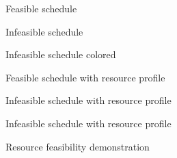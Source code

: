 \documentclass{article}
\begin{document}
\begin{figure}[ht]
	\centering
	
	\caption{Feasible schedule}
	\label{fig:activity_graph}
\end{figure}

\begin{figure}[ht]
	\centering
	
	\caption{Infeasible schedule}
	\label{fig:activity_graph}
\end{figure}

\begin{figure}[ht]
	\centering
	
	\caption{Infeasible schedule colored}
	\label{fig:activity_graph}
\end{figure}

\begin{figure}[ht]
	\centering
	
	\caption{Feasible schedule with resource profile}
	\label{fig:activity_graph}
\end{figure}

\begin{figure}[ht]
	\centering
	
	\caption{Infeasible schedule with resource profile}
	\label{fig:activity_graph}
\end{figure}

\begin{figure}[ht]
	\centering
	
	\caption{Infeasible schedule with resource profile}
	\label{fig:activity_graph}
\end{figure}

\begin{figure}[ht]
	\centering
	\makebox[\textwidth][c]{
		\resizebox{\textwidth}{!}{
			
		}
	}
	\caption{Resource feasibility demonstration}
	\label{fig:activity_graph}
\end{figure}
\end{document}
